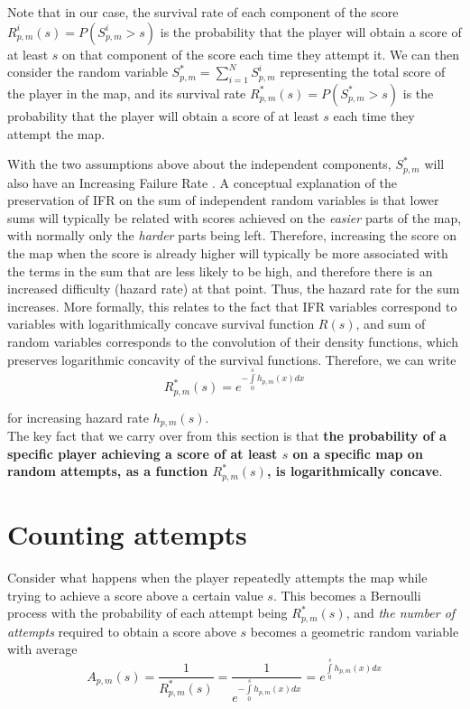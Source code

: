\documentclass[12pt,a4paper]{article}
\begin{document}
Note that in our case, the survival rate of each component of the score $R_{p,m}^i(s) = P(S_{p,m}^i > s)$ is the probability that the player will obtain a score of at least $s$ on that component of the score each time they attempt it. We can then consider the random variable $S_{p,m}^{*} = \sum\limits_{i=1}^N S_{p,m}^i$ representing the total score of the player in the map, and its survival rate $R_{p,m}^{*}(s) = P(S_{p,m}^{*} > s)$ is the probability that the player will obtain a score of at least $s$ each time they attempt the map.

With the two assumptions above about the independent components, $S_{p,m}^{*}$ will also have an Increasing Failure Rate \cite{1975_holt_statistical_theory_reliability}. A conceptual explanation of the preservation of IFR on the sum of independent random variables is that lower sums will typically be related with scores achieved on the {\emph{easier}} parts of the map, with normally only the {\emph{harder}} parts being left. Therefore, increasing the score on the map when the score is already higher will typically be more associated with the terms in the sum that are less likely to be high, and therefore there is an increased difficulty (hazard rate) at that point. Thus, the hazard rate for the sum increases. More formally, this relates to the fact that IFR variables correspond to variables with logarithmically concave survival function $R(s)$, and sum of random variables corresponds to the convolution of their density functions, which preserves logarithmic concavity of the survival functions. Therefore, we can write
\begin{equation}
R_{p,m}^{*}(s) = e^{-\int\limits_0^s h_{p,m}(x) dx}
\end{equation}

\noindent for increasing hazard rate $h_{p,m}(s)$.\\

The key fact that we carry over from this section is that {\bf{the probability of a specific player achieving a score of at least $s$ on a specific map on random attempts, as a function $R_{p,m}^{*}(s)$, is logarithmically concave}}.\\

\section{Counting attempts}

Consider what happens when the player repeatedly attempts the map while trying to achieve a score above a certain value $s$. This becomes a Bernoulli process with the probability of each attempt being $R_{p,m}^{*}(s)$, and {\emph{the number of attempts}} required to obtain a score above $s$ becomes a geometric random variable with average
\begin{equation}
A_{p,m}(s) = \frac{1}{R_{p,m}^{*}(s)} = \frac{1}{e^{-\int\limits_0^s h_{p,m}(x) dx}} = e^{\int\limits_0^s h_{p,m}(x) dx}
\end{equation}
\end{document}
